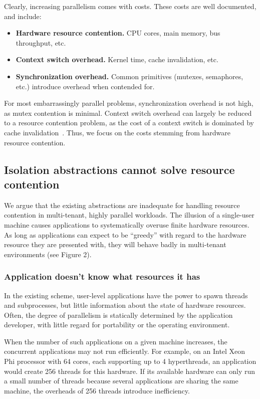 Clearly, increasing parallelism comes with costs. These costs are well documented, and include:
\begin{itemize}
  \item \textbf{Hardware resource contention.} CPU cores, main memory, bus throughput, etc. 
  \item \textbf{Context switch overhead.} Kernel time, cache invalidation, etc.
  \item \textbf{Synchronization overhead.} Common primitives (mutexes, semaphores, etc.) introduce overhead when contended for.
\end{itemize}

For most embarrassingly parallel problems, synchronization overhead is not high, as mutex contention is minimal. Context switch overhead can largely be reduced to a resource contention problem, as the cost of a context switch is dominated by cache invalidation~\cite{li2007quantifying}. Thus, we focus on the costs stemming from hardware resource contention.

\subsection{Isolation abstractions cannot solve resource contention}
We argue that the existing abstractions are inadequate for handling resource contention in multi-tenant, highly parallel workloads. The illusion of a single-user machine causes applications to systematically overuse finite hardware resources. As long as applications can expect to be ``greedy'' with regard to the hardware resource they are presented with, they will behave badly in multi-tenant environments (see Figure 2).

\subsubsection{Application doesn't know what resources it has}
In the existing scheme, user-level applications have the power to spawn threads and subprocesses, but little information about the state of hardware resources. Often, the degree of parallelism is statically determined by the application developer, with little regard for portability or the operating environment.

When the number of such applications on a given machine increases, the concurrent applications may not run efficiently. For example, on an Intel Xeon Phi processor with 64 cores, each supporting up to 4 hyperthreads, an application would create 256 threads for this hardware.  If its available hardware can only run a small number of threads because several applications are sharing the same machine, the overheads of 256 threads introduce inefficiency. 

